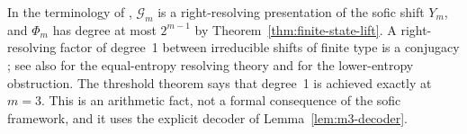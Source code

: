 \begin{remark}\label{rem:sofic-comparison}
In the terminology of \cite{LindMarcus1995}, $\mathcal G_m$ is a
right-resolving presentation of the sofic shift $Y_m$, and $\Phi_m$ has degree
at most $2^{m-1}$ by Theorem~\ref{thm:finite-state-lift}. A right-resolving
factor of degree~1 between irreducible shifts of finite type is a conjugacy
\cite[Theorem~8.1.16]{LindMarcus1995}; see also \cite{Ashley1991} for the
equal-entropy resolving theory and \cite{Boyle1983} for the lower-entropy
obstruction. The threshold theorem says that degree~1 is achieved exactly at
$m=3$. This is an arithmetic fact, not a formal consequence of the sofic
framework, and it uses the explicit decoder of Lemma~\ref{lem:m3-decoder}.
\end{remark}

